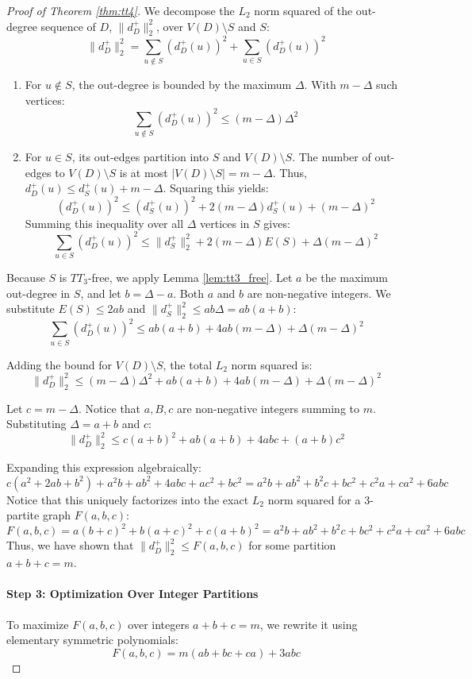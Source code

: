 \documentclass[10pt,a4paper]{amsart}
\begin{document}
\begin{proof}[Proof of Theorem \ref{thm:tt4}]
We decompose the $L_2$ norm squared of the out-degree sequence of $D$, $\|d^+_D\|_2^2$, over $V(D) \setminus S$ and $S$:
\[
\|d^+_D\|_2^2 = \sum_{u \notin S} (d^+_D(u))^2 + \sum_{u \in S} (d^+_D(u))^2
\]

\begin{enumerate}
\item For $u \notin S$, the out-degree is bounded by the maximum $\Delta$.
With $m - \Delta$ such vertices:
\[
\sum_{u \notin S} (d^+_D(u))^2 \le (m - \Delta)\Delta^2
\]
\item For $u \in S$, its out-edges partition into $S$ and $V(D) \setminus S$.
The number of out-edges to $V(D) \setminus S$ is at most $|V(D) \setminus S| = m - \Delta$.
Thus, $d^+_D(u) \le d^+_S(u) + m - \Delta$.
Squaring this yields:
\[
(d^+_D(u))^2 \le (d^+_S(u))^2 + 2(m - \Delta)d^+_S(u) + (m - \Delta)^2
\]
Summing this inequality over all $\Delta$ vertices in $S$ gives:
\[
\sum_{u \in S} (d^+_D(u))^2 \le \|d^+_S\|_2^2 + 2(m - \Delta)E(S) + \Delta(m - \Delta)^2
\]
\end{enumerate}

Because $S$ is $TT_3$-free, we apply Lemma \ref{lem:tt3_free}.
Let $a$ be the maximum out-degree in $S$, and let $b = \Delta - a$.
Both $a$ and $b$ are non-negative integers.
We substitute $E(S) \le 2ab$ and $\|d^+_S\|_2^2 \le ab\Delta = ab(a+b)$:
\[
\sum_{u \in S} (d^+_D(u))^2 \le ab(a+b) + 4ab(m - \Delta) + \Delta(m - \Delta)^2
\]

Adding the bound for $V(D) \setminus S$, the total $L_2$ norm squared is:
\[
\|d^+_D\|_2^2 \le (m - \Delta)\Delta^2 + ab(a+b) + 4ab(m - \Delta) + \Delta(m - \Delta)^2
\]

Let $c = m - \Delta$.
Notice that $a, B, c$ are non-negative integers summing to $m$.
Substituting $\Delta = a+b$ and $c$:
\[
\|d^+_D\|_2^2 \le c(a+b)^2 + ab(a+b) + 4abc + (a+b)c^2
\]

Expanding this expression algebraically:
\[
c(a^2+2ab+b^2) + a^2b+ab^2 + 4abc + ac^2+bc^2 = a^2b + ab^2 + b^2c + bc^2 + c^2a + ca^2 + 6abc
\]
Notice that this uniquely factorizes into the exact $L_2$ norm squared for a 3-partite graph $F(a,b,c)$:
\[
F(a,b,c) = a(b+c)^2 + b(a+c)^2 + c(a+b)^2 = a^2b + ab^2 + b^2c + bc^2 + c^2a + ca^2 + 6abc
\]
Thus, we have shown that $\|d^+_D\|_2^2 \le F(a,b,c) $ for some partition $a+b+c=m$.

\paragraph{Step 3: Optimization Over Integer Partitions}
To maximize $F(a,b,c)$ over integers $a+b+c=m$, we rewrite it using elementary symmetric polynomials:
\[
F(a,b,c) = m(ab+bc+ca) + 3abc
\]


\end{proof}
\end{document}
